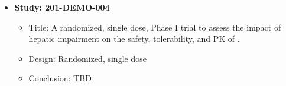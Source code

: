 \begin{itemize}
\item
\textbf{Study: 201-DEMO-004}
\begin{itemize}
\item
Title: A randomized,  single dose, Phase I trial to assess the impact of hepatic 
impairment on the safety, tolerability, and \gls{PK} of \drugx.

\item
Design: Randomized,  single dose
\item
Conclusion: TBD
\end{itemize}
\end{itemize}
